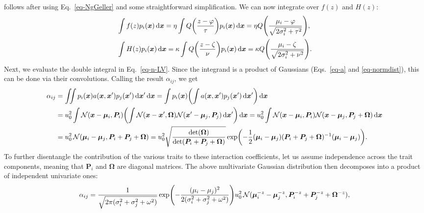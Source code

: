 \documentclass[9pt,twoside,lineno]{pnas-new}
\newcommand{\ud}{\text{d}}
\let\originalleft\left
\let\originalright\right
\renewcommand{\left}{\mathopen{}\mathclose\bgroup\originalleft}
\renewcommand{\right}{\aftergroup\egroup\originalright}
\newcommand{\mat}[1]{\bm{#1}}
\begin{document}
follows after using Eq.~\ref{eq-NgGeller} and some straightforward simplification. We can now integrate over $f(z)$ and $H(z)$:
\begin{align}
  \label{eq-fN}
  &\int f(z) p_i(\mat{x}) \,\ud\mat{x}
  = \eta \int Q\left( \frac{z-\varphi}{\tau} \right)
  p_i(\mat{x}) \,\ud\mat{x}
  = \eta Q\left(\frac{\mu_i-\varphi}
  {\sqrt{2\sigma_i^2+\tau^2}}\right), \\
  \label{eq-HN}
  &\int H(z) p_i(\mat{x}) \,\ud\mat{x}
  = \kappa \int Q\left( \frac{z-\zeta}{\nu} \right)
  p_i(\mat{x}) \,\ud\mat{x}
  = \kappa Q \left(\frac{\mu_i-\zeta}
  {\sqrt{2\sigma_i^2+\nu^2}}\right) .
\end{align}
Next, we evaluate the double integral in Eq.~\ref{eq-n-LV}. Since the integrand is a product of Gaussians (Eqs.~\ref{eq-a} and \ref{eq-normdist}), this can be done via their convolutions. Calling the result $\alpha_{ij}$, we get
\begin{equation}
  \label{eq-alphaN-calc}
  \begin{split}
    \alpha_{ij}
    &= \iint p_i(\mat{x}) a(\mat{x},\mat{x}')
    p_j(\mat{x}') \,\ud \mat{x}' \,\ud \mat{x}
    = \int p_i(\mat{x}) \left( \int a(\mat{x}, \mat{x}')
    p_j(\mat{x}') \,\ud \mat{x}' \right) \,\ud \mat{x}
    \\ &= u_0^2 \int \mathcal{N}(\mat{x} - \mat{\mu}_i, \mat{P}_i)
    \left( \int \mathcal{N}(\mat{x} - \mat{x}', \mat{\Omega})
    \mathcal{N}(\mat{x}' - \mat{\mu}_j, \mat{P}_j)
    \,\ud \mat{x}' \right) \,\ud \mat{x}
    = u_0^2 \int \mathcal{N}(\mat{x} - \mat{\mu}_i, \mat{P}_i)
    \mathcal{N}(\mat{x} - \mat{\mu}_j, \mat{P}_j + \mat{\Omega})
    \,\ud \mat{x}
    \\ &= u_0^2 \, \mathcal{N}(\mat{\mu}_i - \mat{\mu}_j,
    \mat{P}_i + \mat{P}_j + \mat{\Omega})
    = u_0^2 \sqrt{\frac{\det(\mat{\Omega})}
    {\det(\mat{P}_i+\mat{P}_j+\mat{\Omega})}}
    \exp \left( -\frac{1}{2} (\mat{\mu}_i - \mat{\mu}_j)
    (\mat{P}_i + \mat{P}_j +\mat{\Omega})^{-1}
    (\mat{\mu}_i - \mat{\mu}_j) \right) .
  \end{split}
\end{equation}
To further disentangle the contribution of the various traits to these interaction coefficients, let us assume independence across the trait components, meaning that $\mat{P}_i$ and $\mat{\Omega}$ are diagonal matrices. The above multivariate Gaussian distribution then decomposes into a product of independent univariate ones:
\begin{equation}
  \label{eq-a-decomp}
  \alpha_{ij}
  = \frac{1}{\sqrt{2\pi(\sigma_i^2 + \sigma_j^2 + \omega^2)}}
  \exp \left( -\frac{(\mu_i - \mu_j)^2}
  {2(\sigma_i^2 + \sigma_j^2 + \omega^2)} \right)
  u_0^2\, \mathcal{N}(\mat{\mu}_i^{-z} - \mat{\mu}_j^{-z},
  \mat{P}_i^{-z} + \mat{P}_j^{-z} + \mat{\Omega}^{-z}) ,
\end{equation}
\end{document}
